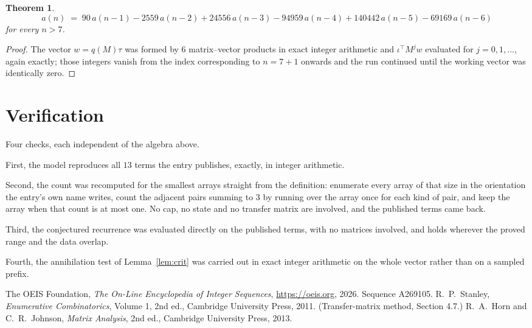 \documentclass[11pt,a4paper]{article}
\theoremstyle{plain}
\newtheorem{theorem}{Theorem}
\theoremstyle{definition}
\begin{document}
\begin{theorem}
\[
a(n)\;=\;90\,a(n-1) - 2559\,a(n-2) + 24556\,a(n-3) - 94959\,a(n-4) + 140442\,a(n-5) - 69169\,a(n-6)
\]
for every $n>7$.
\end{theorem}

\begin{proof}
The vector $w=q(M)\tau$ was formed by $6$ matrix--vector products in exact integer
arithmetic and $\iota^{\!\top}M^{j}w$ evaluated for $j=0,1,\dots$, again exactly; those
integers vanish from the index corresponding to $n=7+1$ onwards and the run continued
until the working vector was identically zero.
\end{proof}

\section{Verification}

Four checks, each independent of the algebra above.

First, the model reproduces all $13$ terms the entry publishes, exactly, in integer
arithmetic.

Second, the count was recomputed for the smallest arrays straight from the definition:
enumerate every array of that size in the orientation the entry's own name writes, count the
adjacent pairs summing to $3$ by running over the array once for each kind of pair, and keep
the array when that count is at most one. No cap, no state and no transfer matrix are involved, and
the published terms came back.

Third, the conjectured recurrence was evaluated directly on the published terms, with no
matrices involved, and holds wherever the proved range and the data overlap.

Fourth, the annihilation test of Lemma~\ref{lem:crit} was carried out in exact integer
arithmetic on the whole vector rather than on a sampled prefix.

\begin{thebibliography}{9}
 The OEIS Foundation, \emph{The On-Line Encyclopedia of Integer
Sequences}, \url{https://oeis.org}, 2026. Sequence A269105.
 R.~P.~Stanley, \emph{Enumerative Combinatorics}, Volume 1, 2nd ed.,
Cambridge University Press, 2011. (Transfer-matrix method, Section 4.7.)
 R.~A.~Horn and C.~R.~Johnson, \emph{Matrix Analysis}, 2nd ed., Cambridge
University Press, 2013.
\end{thebibliography}
\end{document}
